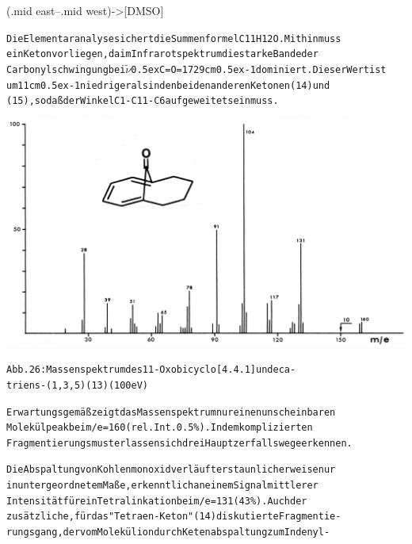 \documentclass[a4paper,11pt]{article}
\begin{document}
\arrow(.mid east--.mid west){->[\hbox{\textsf{DMSO}}]}
\schemestop
\chemnameinit{}
\begin{alltt}

Die Elementaranalyse sichert die Summenformel C11H12O. Mithin muss
ein Keton vorliegen, da im Infrarotspektrum die starke Bande der
Carbonylschwingung bei \(\tilde{\nu}\)\lower0.5ex\hbox{C=O} = 1729 cm\raise0.5ex\hbox{-1} dominiert. Dieser Wert ist
um 11 cm\raise0.5ex\hbox{-1} niedriger als in den beiden anderen Ketonen (14) und
(15), so daß der Winkel C1-C11-C6 aufgeweitet sein muss.


\end{alltt}
\hspace*{-0.25cm}\includegraphics[width=14.444cm]{MASS_026}
\begin{alltt}
Abb. 26: Massenspektrum des 11-Oxobicyclo[4.4.1]undeca-
triens-(1,3,5) (13) (100 eV)

Erwartungsgemäß zeigt das Massenspektrum nur einen unscheinbaren
Molekülpeak bei m/e = 160 (rel. Int. 0.5 \%). In dem komplizierten
Fragmentierungsmuster lassen sich drei Hauptzerfallswege erkennen.

Die Abspaltung von Kohlenmonoxid verläuft erstaunlicherweise nur
in untergeordnetem Maße, erkenntlich an einem Signal mittlerer
Intensität für ein Tetralinkation bei m/e = 131 (43 \%). Auch der
zusätzliche, für das "Tetraen-Keton" (14) diskutierte Fragmentie-
rungsgang, der vom Molekülion durch Ketenabspaltung zum Indenyl-

\newpage
{}


\end{alltt}
\end{document}
